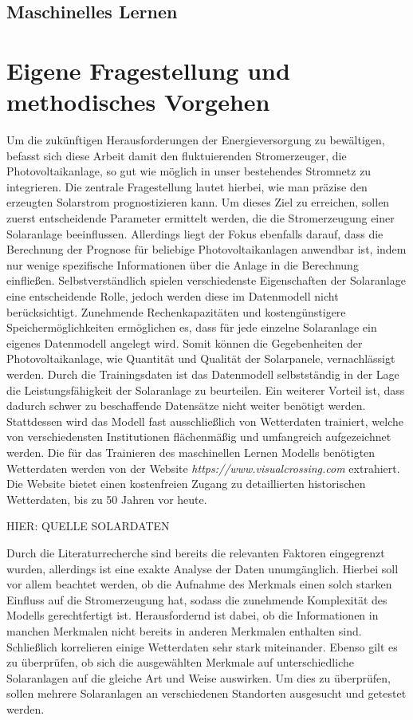 \documentclass[12pt, a4paper]{article}
\begin{document}
\subsection{Maschinelles Lernen}

\newpage

\section{Eigene Fragestellung und methodisches Vorgehen}

Um die zukünftigen Herausforderungen der Energieversorgung zu bewältigen, befasst sich diese Arbeit damit den fluktuierenden Stromerzeuger, die Photovoltaikanlage, so gut wie möglich in unser bestehendes Stromnetz zu integrieren. Die zentrale Fragestellung lautet hierbei, wie man präzise den erzeugten Solarstrom prognostizieren kann. Um dieses Ziel zu erreichen, sollen zuerst entscheidende Parameter ermittelt werden, die die Stromerzeugung einer Solaranlage beeinflussen. Allerdings liegt der Fokus ebenfalls darauf, dass die Berechnung der Prognose für beliebige Photovoltaikanlagen anwendbar ist, indem nur wenige spezifische Informationen über die Anlage in die Berechnung einfließen. Selbstverständlich spielen verschiedenste Eigenschaften der Solaranlage eine entscheidende Rolle, jedoch werden diese im Datenmodell nicht berücksichtigt. Zunehmende Rechenkapazitäten und kostengünstigere Speichermöglichkeiten ermöglichen es, dass für jede einzelne Solaranlage ein eigenes Datenmodell angelegt wird. Somit können die Gegebenheiten der Photovoltaikanlage, wie Quantität und Qualität der Solarpanele, vernachlässigt werden. Durch die Trainingsdaten ist das Datenmodell selbstständig in der Lage die Leistungsfähigkeit der Solaranlage zu beurteilen. Ein weiterer Vorteil ist, dass dadurch schwer zu beschaffende Datensätze nicht weiter benötigt werden. Stattdessen wird das Modell fast ausschließlich von Wetterdaten trainiert, welche von verschiedensten Institutionen flächenmäßig und umfangreich aufgezeichnet werden. Die für das Trainieren des maschinellen Lernen Modells benötigten Wetterdaten werden von der Website \textit{https://www.visualcrossing.com} extrahiert. Die Website bietet einen kostenfreien Zugang zu detaillierten historischen Wetterdaten, bis zu 50 Jahren vor heute. 

HIER: QUELLE SOLARDATEN

Durch die Literaturrecherche sind bereits die relevanten Faktoren eingegrenzt wurden, allerdings ist eine exakte Analyse der Daten unumgänglich. Hierbei soll vor allem beachtet werden, ob die Aufnahme des Merkmals einen solch starken Einfluss auf die Stromerzeugung hat, sodass die zunehmende Komplexität des Modells gerechtfertigt ist. Herausfordernd ist dabei, ob die Informationen in manchen Merkmalen nicht bereits in anderen Merkmalen enthalten sind. Schließlich korrelieren einige Wetterdaten sehr stark miteinander. Ebenso gilt es zu überprüfen, ob sich die ausgewählten Merkmale auf unterschiedliche Solaranlagen auf die gleiche Art und Weise auswirken. Um dies zu überprüfen, sollen mehrere Solaranlagen an verschiedenen Standorten ausgesucht und getestet werden.
\end{document}
